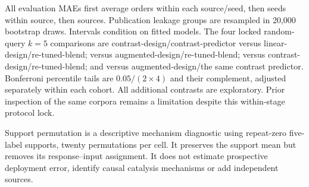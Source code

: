 \documentclass[11pt]{article}
\begin{document}
All evaluation MAEs first average orders within each source/seed, then seeds within source, then sources. Publication leakage groups are resampled in 20,000 bootstrap draws. Intervals condition on fitted models. The four locked random-query $k=5$ comparisons are contrast-design/contrast-predictor versus linear-design/re-tuned-blend; versus augmented-design/re-tuned-blend; versus contrast-design/re-tuned-blend; and versus augmented-design/the same contrast predictor. Bonferroni percentile tails are $0.05/(2\times4)$ and their complement, adjusted separately within each cohort. All additional contrasts are exploratory. Prior inspection of the same corpora remains a limitation despite this within-stage protocol lock.

Support permutation is a descriptive mechanism diagnostic using repeat-zero five-label supports, twenty permutations per cell. It preserves the support mean but removes its response--input assignment. It does not estimate prospective deployment error, identify causal catalysis mechanisms or add independent sources.
\end{document}
